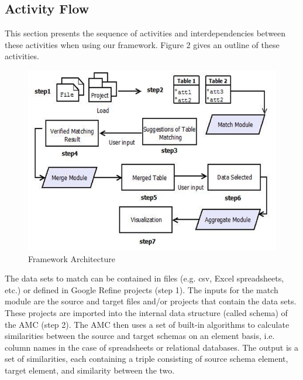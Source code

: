\documentclass{sig-alternate}
\begin{document}
\subsection{Activity Flow}
This section presents the sequence of activities and interdependencies between these activities when using our framework. Figure 2 gives an outline of these activities.
\begin{figure}[ht!]
  \centering
    \includegraphics[scale=0.4]{architecture-2.png} 
  \caption{Framework Architecture}
\end{figure}
The data sets to match can be contained in files (e.g. csv, Excel spreadsheets, etc.) or defined in Google Refine projects (step 1). The inputs for the match module are the source and target files and/or projects that contain the data sets. These projects are imported into the internal data structure (called schema) of the AMC \cite{5767940} (step 2). The AMC then uses a set of built-in algorithms to calculate similarities between the source and target schemas on an element basis, i.e. column names in the case of spreadsheets or relational databases. The output is a set of similarities, each containing a triple consisting of source schema element, target element, and similarity between the two.
\end{document}
